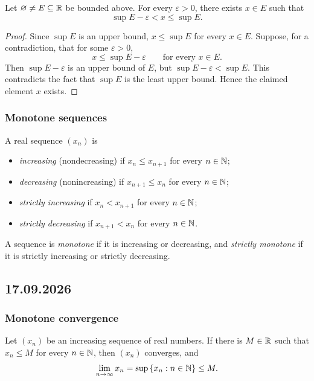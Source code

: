 \documentclass[11pt,a4paper]{amsart}
\begin{document}
\begin{theorem}
  Let \(\varnothing\neq E\subseteq\mathbb{R}\) be bounded above. For every
  \(\varepsilon>0\), there exists \(x\in E\) such that
  \[
    \sup E-\varepsilon<x\leq\sup E.
  \]
\end{theorem}

\begin{proof}
  Since \(\sup E\) is an upper bound, \(x\leq\sup E\) for every
  \(x\in E\). Suppose, for a contradiction, that for some
  \(\varepsilon>0\),
  \[
    x\leq\sup E-\varepsilon \qquad\text{for every }x\in E.
  \]
  Then \(\sup E-\varepsilon\) is an upper bound of \(E\), but
  \(\sup E-\varepsilon<\sup E\). This contradicts the fact that \(\sup E\)
  is the least upper bound. Hence the claimed element \(x\) exists.
\end{proof}

\subsubsection{Monotone sequences}

\begin{definition}
  A real sequence \((x_n)\) is
  \begin{itemize}
    \item \emph{increasing} (nondecreasing) if \(x_n\leq x_{n+1}\) for
      every \(n\in\mathbb{N}\);
    \item \emph{decreasing} (nonincreasing) if \(x_{n+1}\leq x_n\) for
      every \(n\in\mathbb{N}\);
    \item \emph{strictly increasing} if \(x_n<x_{n+1}\) for every
      \(n\in\mathbb{N}\);
    \item \emph{strictly decreasing} if \(x_{n+1}<x_n\) for every
      \(n\in\mathbb{N}\).
  \end{itemize}
  A sequence is \emph{monotone} if it is increasing or decreasing, and
  \emph{strictly monotone} if it is strictly increasing or strictly decreasing.
\end{definition}

\subsection{17.09.2026}

\subsubsection{Monotone convergence}

\begin{theorem}\label{thm:monotone-convergence}
  Let \((x_n)\) be an increasing sequence of real numbers. If there is
  \(M\in\mathbb{R}\) such that \(x_n\leq M\) for every \(n\in\mathbb{N}\), then
  \((x_n)\) converges, and
  \[
    \lim_{n\to\infty}x_n=\sup\left\lbrace x_n:n\in\mathbb{N}\right\rbrace\leq M.
  \]
\end{theorem}
\end{document}
